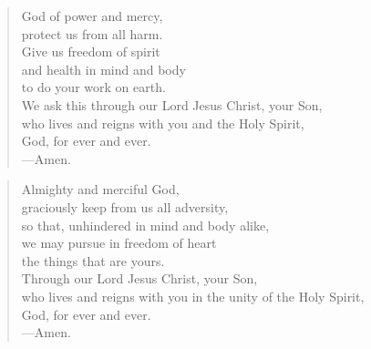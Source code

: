 \prayer

\setlength{\leftmargini}{\prayerleftmargini}

\begin{verse}
God of power and mercy,\\
protect us from all harm.\\
Give us freedom of spirit\\
and health in mind and body\\
to do your work on earth.\\
We ask this through our Lord Jesus Christ, your Son,\\
who lives and reigns with you and the Holy Spirit,\\
God, for ever and ever.\\
{\color{red}---\thinspace}Amen.
\end{verse}


\begin{verse}
Almighty and merciful God,\\
graciously keep from us all adversity,\\
so that, unhindered in mind and body alike,\\
we may pursue in freedom of heart\\
the things that are yours.\\
Through our Lord Jesus Christ, your Son,\\
who lives and reigns with you in the unity of the Holy Spirit,\\
God, for ever and ever.\\
{\color{red}---\thinspace}Amen.
\end{verse}

\setlength{\leftmargini}{\defleftmargini}